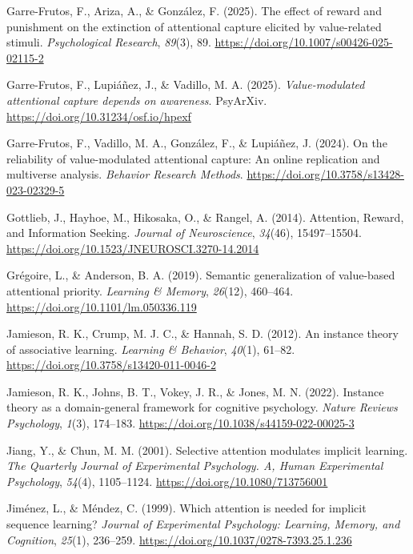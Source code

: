\documentclass[
  jou,
  floatsintext,
  longtable,
  nolmodern,
  notxfonts,
  notimes,
  colorlinks=true,linkcolor=blue,citecolor=blue,urlcolor=blue]{apa7}
\newlength{\cslhangindent}
\newenvironment{CSLReferences}[2] %
 {\begin{list}{}{%
  \setlength{\itemindent}{0pt}
  \setlength{\leftmargin}{0pt}
  \setlength{\parsep}{0pt}
  \ifodd #1
   \setlength{\leftmargin}{\cslhangindent}
   \setlength{\itemindent}{-1\cslhangindent}
  \fi
  \setlength{\itemsep}{#2\baselineskip}}}
 {\end{list}}
\begin{document}
\begin{CSLReferences}{1}{0}
Garre-Frutos, F., Ariza, A., \& González, F. (2025). The effect of
reward and punishment on the extinction of attentional capture elicited
by value-related stimuli. \emph{Psychological Research}, \emph{89}(3),
89. \url{https://doi.org/10.1007/s00426-025-02115-2}

Garre-Frutos, F., Lupiáñez, J., \& Vadillo, M. A. (2025).
\emph{Value-modulated attentional capture depends on awareness}.
PsyArXiv. \url{https://doi.org/10.31234/osf.io/hpexf}

Garre-Frutos, F., Vadillo, M. A., González, F., \& Lupiáñez, J. (2024).
On the reliability of value-modulated attentional capture: An online
replication and multiverse analysis. \emph{Behavior Research Methods}.
\url{https://doi.org/10.3758/s13428-023-02329-5}

Gottlieb, J., Hayhoe, M., Hikosaka, O., \& Rangel, A. (2014). Attention,
Reward, and Information Seeking. \emph{Journal of Neuroscience},
\emph{34}(46), 15497--15504.
\url{https://doi.org/10.1523/JNEUROSCI.3270-14.2014}

Grégoire, L., \& Anderson, B. A. (2019). Semantic generalization of
value-based attentional priority. \emph{Learning \& Memory},
\emph{26}(12), 460--464. \url{https://doi.org/10.1101/lm.050336.119}

Jamieson, R. K., Crump, M. J. C., \& Hannah, S. D. (2012). An instance
theory of associative learning. \emph{Learning \& Behavior},
\emph{40}(1), 61--82. \url{https://doi.org/10.3758/s13420-011-0046-2}

Jamieson, R. K., Johns, B. T., Vokey, J. R., \& Jones, M. N. (2022).
Instance theory as a domain-general framework for cognitive psychology.
\emph{Nature Reviews Psychology}, \emph{1}(3), 174--183.
\url{https://doi.org/10.1038/s44159-022-00025-3}

Jiang, Y., \& Chun, M. M. (2001). Selective attention modulates implicit
learning. \emph{The Quarterly Journal of Experimental Psychology. A,
Human Experimental Psychology}, \emph{54}(4), 1105--1124.
\url{https://doi.org/10.1080/713756001}

Jiménez, L., \& Méndez, C. (1999). Which attention is needed for
implicit sequence learning? \emph{Journal of Experimental Psychology:
Learning, Memory, and Cognition}, \emph{25}(1), 236--259.
\url{https://doi.org/10.1037/0278-7393.25.1.236}


\end{CSLReferences}
\end{document}
